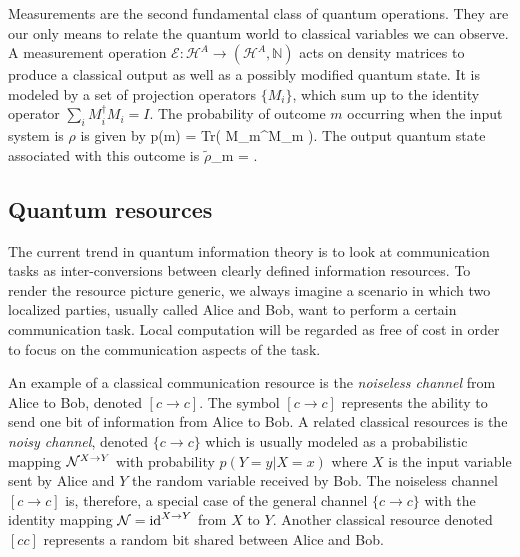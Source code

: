 \documentclass[aps,11pt,twoside,letterpaper]{article}
\def\Tr{\textup{Tr}}
\def\E{\mathcal{E}}
\def\cH{\mathcal{H}}
\def\NN{\mathbb{N}}
\newcommand{\rhot}{{\ensuremath{\tilde{\rho}}}}
\begin{document}
				
			Measurements are the second fundamental class of quantum operations. 
			They are our only means to relate the quantum world to classical variables we can observe.
			A measurement operation $\E\!\!:\!\!\cH^A \to (\cH^A,\NN)$ acts on density matrices to produce a classical
			output as well as a possibly modified quantum state.
			It is modeled by a set of projection operators $\{M_i\}$, which sum up to the identity operator 
			$\sum_i M_i^\dag M_i = I$.
			The probability of outcome $m$ occurring when the input system is $\rho$ is given by
			\be
				p(m)	=	\Tr\!\left( M_m^\dag \rho M_m \right).
			\ee
			The output quantum state associated with this outcome is
			\be
				 \rhot_m	=  \frac{M_m^\dag \rho M_m}{	\Tr\!\left( M_m^\dag \rho M_m \right)	}.
			\ee
			


		\bigskip
		\subsection{Quantum resources}	\label{subsection:quantum-resources}
		
			The current trend in quantum information theory is to look at communication tasks as inter-conversions
			between clearly defined information resources. 
			To render the resource picture generic, we always imagine a scenario in which two localized parties,
			usually called Alice and Bob, want to perform a certain communication task.
			Local computation will be regarded as free of cost in order to focus on the communication aspects 
			of the task. 
			
			An example of a classical communication resource is the \emph{noiseless channel} from 
			Alice to Bob, denoted $[c\to c]$. 
			The symbol $[c \to c]$ represents the ability to send one bit of information from Alice to Bob.
			A related classical resources is the \emph{noisy channel}, denoted $\{c\to c\}$ which is usually 
			modeled as a probabilistic mapping ${\cal N}^{X \to Y}$ with probability $p(Y=y|X=x)$ where
			$X$ is the input variable sent by Alice and $Y$ the random variable received by Bob.
			The noiseless channel $[c\to c]$ is, therefore, a special case of the general channel $\{c\to c\}$ 
			with the identity mapping ${\cal N} = \operatorname{id}^{X \to Y}$ from $X$ to $Y$.
			Another classical resource denoted $[cc]$ represents a random bit shared between Alice and Bob.
			
\end{document}

